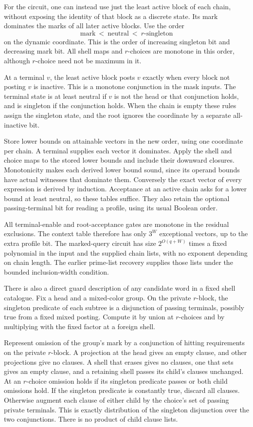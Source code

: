 For the circuit, one can instead use just the least
active block of each chain, without exposing the
identity of that block as a discrete state. Its mark
dominates the marks of all later active blocks.
Use the order
\[
            \text{mark}\ <\ \text{neutral}\ <\
            r\text{-singleton}
\]
on the dynamic coordinate. This is the order of
increasing singleton bit and decreasing mark bit.
All shell maps and $r$-choices are monotone in
this order, although $r$-choice need not be maximum
in it.

At a terminal $v$, the least active block posts
$v$ exactly when every block not posting $v$ is
inactive. This is a monotone conjunction in the
mask inputs. The terminal state is at least
neutral if $v$ is not the head or that conjunction
holds, and is singleton if the conjunction
holds. When the chain is empty these rules assign
the singleton state, and the root ignores the
coordinate by a separate all-inactive bit.

Store lower bounds on attainable vectors in the
new order, using one coordinate per chain. A
terminal supplies each vector it dominates.
Apply the shell and choice maps to the stored
lower bounds and include their downward closures.
Monotonicity makes each derived lower bound
sound, since its operand bounds have actual
witnesses that dominate them. Conversely the
exact vector of every expression is derived by
induction. Acceptance at an active chain asks
for a lower bound at least neutral, so these
tables suffice. They also retain the optional
passing-terminal bit for reading a profile, using
its usual Boolean order.

All terminal-enable and root-acceptance gates
are monotone in the residual exclusions.
The context table therefore has only $3^W$
exceptional vectors, up to the extra profile
bit. The marked-query circuit has size
$2^{O(q+W)}$ times a fixed polynomial in the
input and the supplied chain lists, with no
exponent depending on chain length. The earlier
prime-list recovery supplies those lists under
the bounded inclusion-width condition.

There is also a direct guard description of any
candidate word in a fixed shell catalogue. Fix a
head and a mixed-color group. On the private
$r$-block, the singleton predicate of each subtree
is a disjunction of passing terminals, possibly
true from a fixed mixed posting. Compute it by
union at $r$-choices and by multiplying with the
fixed factor at a foreign shell.

Represent omission of the group's mark by a
conjunction of hitting requirements on the
private $r$-block. A projection at the head
gives an empty clause, and other projections
give no clauses. A shell that erases gives
no clauses, one that sets gives an empty
clause, and a retaining shell passes its
child's clauses unchanged. At an $r$-choice
omission holds if its singleton predicate
passes or both child omissions hold. If the
singleton predicate is constantly true, discard
all clauses. Otherwise augment each clause
of either child by the choice's set of passing
private terminals. This is exactly distribution
of the singleton disjunction over the two
conjunctions. There is no product of child
clause lists.

